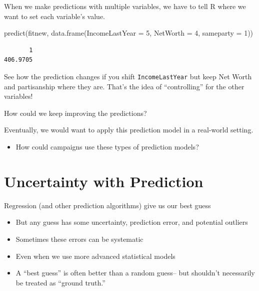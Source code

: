 \documentclass[
  letterpaper,
  DIV=11,
  numbers=noendperiod]{scrreprt}
\newenvironment{Shaded}{\begin{snugshade}}{\end{snugshade}}
\newcommand{\AttributeTok}[1]{\textcolor[rgb]{0.40,0.45,0.13}{#1}}
\newcommand{\DecValTok}[1]{\textcolor[rgb]{0.68,0.00,0.00}{#1}}
\newcommand{\FunctionTok}[1]{\textcolor[rgb]{0.28,0.35,0.67}{#1}}
\newcommand{\NormalTok}[1]{\textcolor[rgb]{0.00,0.23,0.31}{#1}}
\providecommand{\tightlist}{%
  \setlength{\itemsep}{0pt}\setlength{\parskip}{0pt}}\usepackage{longtable,booktabs,array}
\begin{document}
When we make predictions with multiple variables, we have to tell R
where we want to set each variable's value.

\begin{Shaded}
\begin{Highlighting}[]
\FunctionTok{predict}\NormalTok{(fitnew, }\FunctionTok{data.frame}\NormalTok{(}\AttributeTok{IncomeLastYear =} \DecValTok{5}\NormalTok{, }\AttributeTok{NetWorth =} \DecValTok{4}\NormalTok{, }\AttributeTok{sameparty =} \DecValTok{1}\NormalTok{))}
\end{Highlighting}
\end{Shaded}

\begin{verbatim}
       1 
406.9705 
\end{verbatim}

See how the prediction changes if you shift \texttt{IncomeLastYear} but
keep Net Worth and partisanship where they are. That's the idea of
``controlling'' for the other variables!

How could we keep improving the predictions?

Eventually, we would want to apply this prediction model in a real-world
setting.

\begin{itemize}
\tightlist
\item
  How could campaigns use these types of prediction models?
\end{itemize}

\hypertarget{uncertainty-with-prediction}{%
\section{Uncertainty with
Prediction}\label{uncertainty-with-prediction}}

Regression (and other prediction algorithms) give us our best guess

\begin{itemize}
\tightlist
\item
  But any guess has some uncertainty, prediction error, and potential
  outliers
\item
  Sometimes these errors can be systematic
\item
  Even when we use more advanced statistical models
\item
  A ``best guess'' is often better than a random guess-- but shouldn't
  necessarily be treated as ``ground truth.''
\end{itemize}
\end{document}
